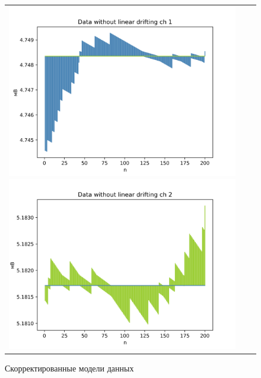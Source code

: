 \begin{figure}[H]
	\begin{tabular}{ccc}
		\includegraphics[scale=0.5]{resources/fixed_PR1.png}
		\includegraphics[scale=0.5]{resources/fixed_PR2.png}
	\end{tabular}
	\caption{Скорректированные модели данных} 
\end{figure}


